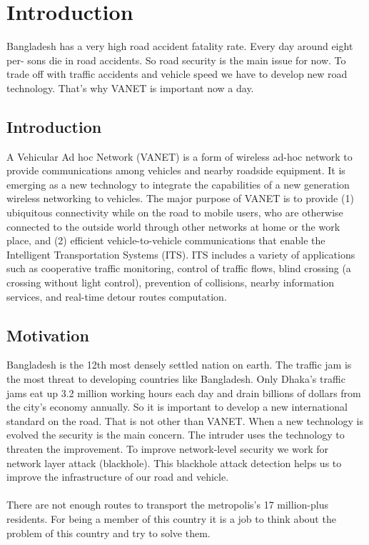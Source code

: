 
\chapter{Introduction} %

\label{Chapter1} %

Bangladesh has a very high road accident fatality rate. Every day around eight per-
sons die in road accidents.\cite{qn} So road security is the main issue for now. To trade off with traffic accidents and vehicle speed we have to develop new road technology. That's why VANET is important now a day.

\section{Introduction}
A Vehicular Ad hoc Network (VANET) is a form of wireless ad-hoc network to
provide communications among vehicles and nearby roadside equipment. It is
emerging as a new technology to integrate the capabilities of a new generation
wireless networking to vehicles. The major purpose of VANET is to provide
(1) ubiquitous connectivity while on the road to mobile users, who are otherwise
connected to the outside world through other networks at home or the work
place, and (2) efficient vehicle-to-vehicle communications that enable the Intelligent Transportation Systems (ITS). ITS includes a variety of applications such
as cooperative traffic monitoring, control of traffic flows, blind crossing
(a crossing without light control), prevention of collisions, nearby information
services, and real-time detour routes computation.


\section{Motivation}
Bangladesh is the 12th most densely settled nation on earth. The traffic jam is the most threat
to developing countries like Bangladesh. Only Dhaka's traffic jams eat up 3.2 million working hours each day and drain billions of dollars from the city's economy annually. So it is important to develop a new international standard on the road. That is not other than VANET.
When a new technology is evolved the security is the main concern. The intruder uses the technology to threaten the improvement. To improve network-level security we work for network layer attack (blackhole). 
This blackhole attack detection helps us to improve the infrastructure of our
road and vehicle.\cite{qn}
\\\\
There are not enough routes to transport the metropolis's 17 million-plus residents.
For being a member of this country it is a job to think about the problem of this country
and try to solve them.

